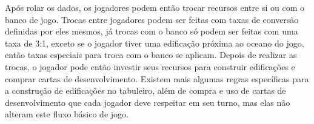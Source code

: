 Após rolar os dados, os jogadores podem então trocar recursos entre si ou com o banco de jogo. Trocas entre jogadores podem ser feitas com taxas de conversão definidas por eles mesmos, já trocas com o banco só podem ser feitas com uma taxa de 3:1, exceto se o jogador tiver uma edificação próxima ao oceano do jogo, então taxas especiais para troca com o banco se aplicam. Depois de realizar as trocas, o jogador pode então investir seus recursos para construir edificações e comprar cartas de desenvolvimento. Existem mais algumas regras específicas para a construção de edificações no tabuleiro, além de compra e uso de cartas de desenvolvimento que cada jogador deve respeitar em seu turno, mas elas não alteram este fluxo básico de jogo.










